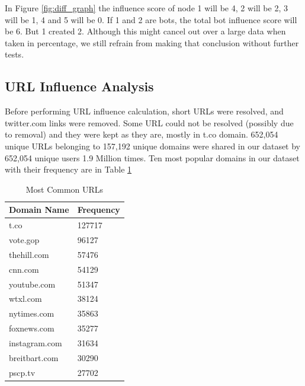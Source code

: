 \documentclass[letterpaper]{article}
\begin{document}
In Figure \ref{fig:diff_graph} the influence score of node 1 will be 4, 2 will be 2, 3 will be 1, 4 and 5 will be 0. If 1 and 2 are bots, the total bot influence score will be 6. But 1 created 
2. Although this might cancel out over a large data when taken in percentage, we still refrain from making that conclusion without further tests. 

\subsection{URL Influence Analysis}
Before performing URL influence calculation, short URLs were resolved, and twitter.com links were removed. Some URL could not be resolved (possibly due to removal) and they were kept as they are, 
mostly in t.co domain. 652,054 unique URLs belonging to 157,192 unique domains were shared in our dataset by 652,054 unique users 1.9 Million times. Ten most popular domains in our dataset with their frequency are
in Table \ref{tab:Common_urls}

\begin{table}[H]
    \centering
    \begin{tabular}{|l|l|}
    \hline
    \textbf{Domain Name} & \textbf{Frequency} \\ \hline
    t.co & 127717 \\ \hline
    vote.gop & 96127 \\ \hline
    thehill.com & 57476 \\ \hline
    cnn.com & 54129 \\ \hline
    youtube.com & 51347 \\ \hline
    wtxl.com & 38124 \\ \hline
    nytimes.com & 35863 \\ \hline
    foxnews.com & 35277 \\ \hline
    instagram.com & 31634 \\ \hline
    breitbart.com & 30290 \\ \hline
    pscp.tv & 27702 \\ \hline
    \end{tabular}
    \caption{Most Common URLs}
    \label{tab:Common_urls}
\end{table}
\end{document}
